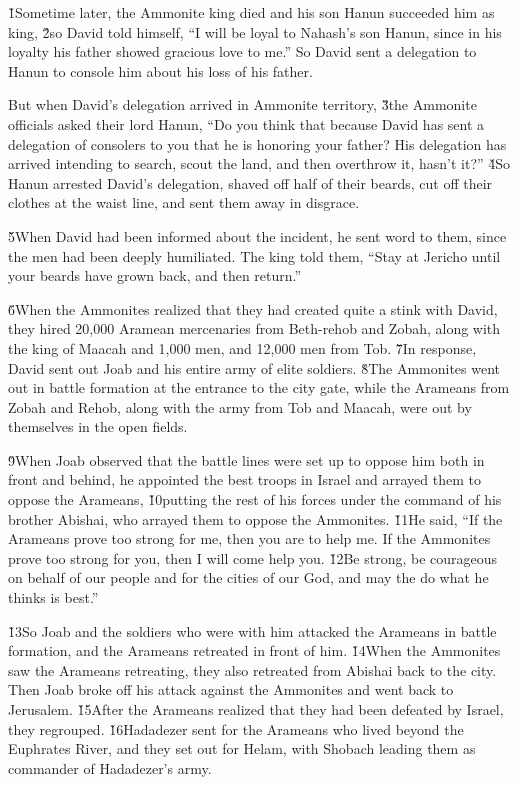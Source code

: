 \v{1}Sometime later, the Ammonite king died and his son Hanun succeeded him as king, \v{2}so David told himself, ``I will be loyal to Nahash's son Hanun, since in his loyalty his father showed gracious love to me.'' So David sent a delegation to Hanun to console him about his loss of his father.

But when David's delegation arrived in Ammonite territory, \v{3}the Ammonite officials asked their lord Hanun, ``Do you think that because David has sent a delegation of consolers to you that he is honoring your father? His delegation has arrived intending to search, scout the land, and then overthrow it, hasn't it?'' \v{4}So Hanun arrested David's delegation, shaved off half of their beards, cut off their clothes at the waist line, and sent them away in disgrace.

\v{5}When David had been informed about the incident, he sent word to them, since the men had been deeply humiliated. The king told them, ``Stay at Jericho until your beards have grown back, and then return.''

\v{6}When the Ammonites realized that they had created quite a stink with David, they hired 20,000 Aramean mercenaries from Beth-rehob and Zobah, along with the king of Maacah and 1,000 men, and 12,000 men from Tob. \v{7}In response, David sent out Joab and his entire army of elite soldiers. \v{8}The Ammonites went out in battle formation at the entrance to the city gate, while the Arameans from Zobah and Rehob, along with the army from Tob and Maacah, were out by themselves in the open fields.

\v{9}When Joab observed that the battle lines were set up to oppose him both in front and behind, he appointed the best troops in Israel and arrayed them to oppose the Arameans, \v{10}putting the rest of his forces under the command of his brother Abishai, who arrayed them to oppose the Ammonites. \v{11}He said, ``If the Arameans prove too strong for me, then you are to help me. If the Ammonites prove too strong for you, then I will come help you. \v{12}Be strong, be courageous on behalf of our people and for the cities of our God, and may the  do what he thinks is best.''

\v{13}So Joab and the soldiers who were with him attacked the Arameans in battle formation, and the Arameans retreated in front of him. \v{14}When the Ammonites saw the Arameans retreating, they also retreated from Abishai back to the city. Then Joab broke off his attack against the Ammonites and went back to Jerusalem. \v{15}After the Arameans realized that they had been defeated by Israel, they regrouped. \v{16}Hadadezer sent for the Arameans who lived beyond the Euphrates River, and they set out for Helam, with Shobach leading them as commander of Hadadezer's army.

